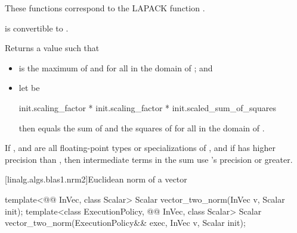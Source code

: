 \begin{itemdescr}
\pnum
\begin{note}
These functions correspond to the LAPACK function \supercite{lapack}.
\end{note}

\pnum
\mandates
{} is convertible to .

\pnum
\effects
Returns a value  such that
\begin{itemize}
\item
{} is the maximum of  and
for all  in the domain of ; and
\item
let  be
\begin{codeblock}
init.scaling_factor * init.scaling_factor * init.scaled_sum_of_squares
\end{codeblock}
then 
equals the sum of  and
the squares of 
for all  in the domain of .
\end{itemize}

\pnum
\remarks
If , and 
are all floating-point types or specializations of ,
and if  has higher precision
than ,
then intermediate terms in the sum use 's precision or greater.
\end{itemdescr}

[linalg.algs.blas1.nrm2]{Euclidean norm of a vector}

%
\begin{itemdecl}
template<@@ InVec, class Scalar>
  Scalar vector_two_norm(InVec v, Scalar init);
template<class ExecutionPolicy, @@ InVec, class Scalar>
  Scalar vector_two_norm(ExecutionPolicy&& exec, InVec v, Scalar init);
\end{itemdecl}

